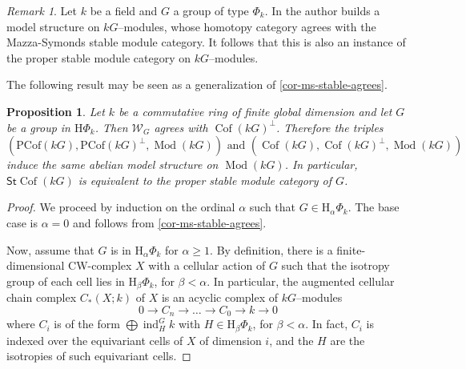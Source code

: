 \documentclass{amsart}
\newcommand{\ind}{\operatorname{ind}\nolimits}
\def \Wfin{{\mathcal W}_{G}}
\DeclareMathOperator{\Mod}{Mod}
\DeclareMathOperator{\Cof}{Cof}
\numberwithin{equation}{section}%
\newtheorem{proposition}[equation]{Proposition}
\theoremstyle{remark}
\newtheorem{remark}[equation]{Remark}
\begin{document}
{%

\begin{remark}\label{rem-stable-inftycat2}
Let $k$ be a field and $G$ a group of type $\Phi_k$. In \cite{Gom24} the author builds a model structure on $kG$--modules, whose homotopy category agrees with the Mazza-Symonds stable module category. It follows that this is also an instance of the proper stable module category on $kG$--modules.
\end{remark}

The following result may be seen  as a generalization of \cref{cor-ms-stable-agrees}.

\begin{proposition}\label{prop-model-hphi}
    Let $k$ be a commutative ring of finite global dimension and let $G$ be a group in $\mathrm{H}\Phi_k$. Then $\Wfin$ agrees with $\Cof(kG)^\perp$. Therefore the triples
    \[
    (\mathrm{PCof}(kG),\mathrm{PCof}(kG)^{\bot},\Mod(kG)) \mbox{  and  } (\Cof(kG),\Cof(kG)^\perp,\Mod(kG))
    \]
      induce the same abelian model structure on $\Mod(kG)$.  In particular, $\mathsf{St}{\Cof}(kG)$ is equivalent to the proper stable module category of $G$.
\end{proposition}

\begin{proof}
We proceed by induction on the ordinal $\alpha$ such that $G\in \mathrm{H}_\alpha\Phi_k$. The base case is $\alpha=0$ {and follows from  \cref{cor-ms-stable-agrees}.}


Now, assume that $G$ is in $\mathrm{H}_\alpha\Phi_k$ for $\alpha\geq1$. By definition, there is a finite-dimensional CW-complex $X$ with a cellular action of $G$ such that the isotropy group of each cell lies in $\mathrm{H}_\beta\Phi_k$, for $\beta<\alpha$. In particular, the augmented  cellular chain complex $C_\ast(X;k)$ of $X$ is an acyclic complex of $kG$--modules 
 \begin{equation}
        \label{eq-cell-chain}
        0\to C_n \to \ldots \to C_0\to k\to 0
    \end{equation}
where $C_i$ is of the form $\bigoplus \ind_H^G k$ with $H\in \mathrm{H}_\beta\Phi_k$, for $\beta<\alpha$. In fact, $C_i$ is indexed over the equivariant cells of $X$ of dimension $i$, and the $H$ are the isotropies of such equivariant cells. 


\end{proof}}
\end{document}
